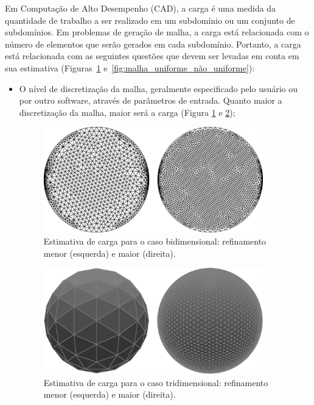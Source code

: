Em Computação de Alto Desempenho (CAD), a carga é uma medida da quantidade de trabalho a ser realizado em um subdomínio ou um conjunto de subdomínios. Em problemas de geração de malha, a carga está relacionada com o número de elementos que serão gerados em cada subdomínio. Portanto, a carga está relacionada com as seguintes questões que devem ser levadas em conta em sua estimativa (Figuras~\ref{fig:malha_norma_refinada} e~\ref{fig:malha_uniforme_não_uniforme}):

\begin{itemize}
	\item O nível de discretização da malha, geralmente especificado pelo usuário ou por outro software, através de parâmetros de entrada. Quanto maior a discretização da malha, maior será a carga (Figura \ref{fig:malha_norma_refinada} e \ref{fig:malha_norma_refinada_trid});

\begin{figure}[!ht]
	\centering
	\includegraphics[width=0.9\textwidth]{fig/meshes_normal_and_refined.png}
	\caption{Estimativa de carga para o caso bidimensional: refinamento menor (esquerda) e maior (direita).}
	\label{fig:malha_norma_refinada}
\end{figure}

\begin{figure}[!ht]
	\centering
	\includegraphics[width=0.9\textwidth]{fig/esferas_comp_ref.png}
	\caption{Estimativa de carga para o caso tridimensional: refinamento menor (esquerda) e maior (direita).}
	\label{fig:malha_norma_refinada_trid}
\end{figure}


\end{itemize}
